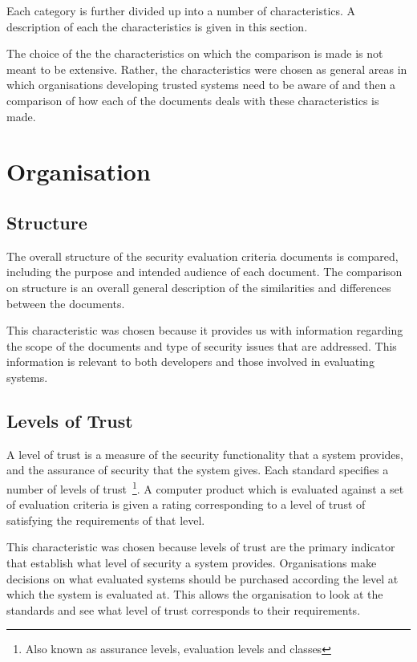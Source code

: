     Each category is further divided up into a number of characteristics. A
    description of each the characteristics is given in this section.

    The choice of the the characteristics on which the comparison is
    made is not meant to be extensive. Rather, the characteristics were
    chosen as general areas in which organisations developing trusted
    systems need to be aware of and then a comparison of how each of the
    documents deals with these characteristics is made.

    \section{Organisation}

        \subsection{Structure}
            The overall structure of the security evaluation criteria
            documents is compared, including the purpose and intended
            audience of each document. The comparison on structure is an
            overall general description of the similarities and
            differences between the documents.

            This characteristic was chosen because it provides us with 
            information regarding the scope of the documents and type of security
            issues that are addressed. This information is relevant to both
            developers and those involved in evaluating systems.

        \subsection{Levels of Trust}
            A level of trust is a measure of the security functionality 
            that a system provides, and the assurance of security that the
            system gives.
            Each standard specifies a number of levels of trust~\footnote{Also known
            as assurance levels, evaluation levels and classes}.
            A computer product
            which is evaluated against a set of evaluation criteria is
            given a rating corresponding to a level of trust of
            satisfying the requirements of that level.

            This characteristic was chosen because levels of trust are the primary
            indicator that establish what level of security a system provides.
            Organisations make decisions on what evaluated systems should be purchased
            according the level at which the system is evaluated at. This allows the
            organisation to look at the standards and see what level of trust corresponds
            to their requirements. 

